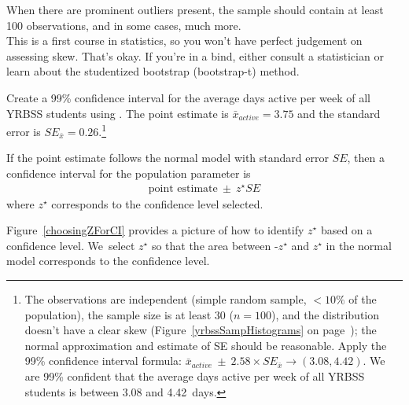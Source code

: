 \begin{tipBox}{
When there are prominent outliers present, the sample should contain at least 100 observations, and in some cases, much more. \\[2mm]
This is a first course in statistics, so you won't have perfect judgement on assessing skew. That's okay. If you're in a bind, either consult a statistician or learn about the studentized bootstrap (bootstrap-t) method.}
\end{tipBox}

\begin{exercise} \label{find99CIForYrbssAgeExercise}
Create a 99\% confidence interval for the average days active per week of all YRBSS students using . The point estimate is $\bar{x}_{active} = 3.75$ and the standard error is $SE_{\bar{x}} = 0.26$.\footnote{The observations are independent (simple random sample, $<10\%$ of the population), the sample size is at least 30 ($n = 100$), and the distribution doesn't have a clear skew (Figure~\ref{yrbssSampHistograms} on page~\pageref{yrbssSampHistograms}); the normal approximation and estimate of SE should be reasonable. Apply the 99\% confidence interval formula: $\bar{x}_{active}\ \pm\ 2.58 \times  SE_{\bar{x}} \rightarrow (3.08, 4.42)$. We are 99\% confident that the average days active per week of all YRBSS students is between 3.08 and 4.42~days.}
\end{exercise}

\begin{termBox}{
If the point estimate follows the normal model with standard error $SE$, then a confidence interval for the population parameter is
\begin{eqnarray*}
\text{point estimate}\ \pm\ z^{\star} SE
\end{eqnarray*}
where $z^{\star}$ corresponds to the confidence level selected.}
\end{termBox}

Figure~\ref{choosingZForCI} provides a picture of how to identify $z^{\star}$ based on a confidence level. We~select $z^{\star}$ so that the area between -$z^{\star}$ and $z^{\star}$ in the normal model corresponds to the confidence level. 

